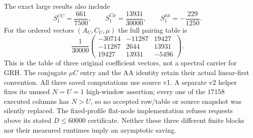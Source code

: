 The exact large results also include
\[
 S_1^{CC}=\frac{661}{7500},\qquad
 S_1^{C\mu}=\frac{13931}{30000},\qquad
 S_1^{\mu\mu}=-\frac{229}{1250}.
\]
For the ordered vectors $(A_U,C_U,\mu)$ the full pairing table is
\[
 \frac1{30000}
 \begin{pmatrix}
 -30714&-11287&19427\\
 -11287&2644&13931\\
 19427&13931&-5496
 \end{pmatrix}.
\]
This is the table of three original coefficient vectors, not a spectral
carrier for GRH. The conjugate $\mu C$ entry and the AA identity retain
their actual linear-first convention. All three saved computations use source v1.
A separate v2 helper fixes its unused $N=U=1$ high-window assertion;
every one of the $17158$ executed columns has $N>U$, so no accepted
row/table or source snapshot was silently replaced.
The fixed-profile flat-node implementation refuses requests above its
stated $D\le60000$ certificate. Neither these three different finite
blocks nor their measured runtimes imply an asymptotic saving.
